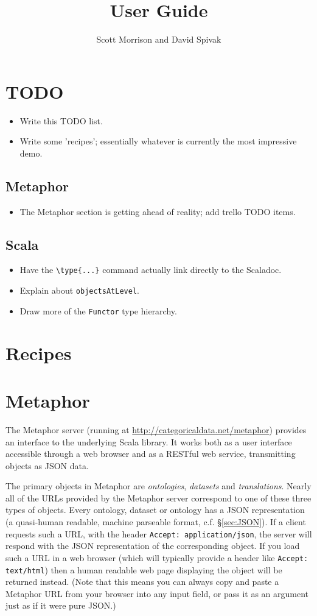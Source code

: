 \documentclass{amsart}
\title{User Guide}
\author{Scott Morrison and David Spivak}
\newcommand{\type}[1]{{\tt #1}}
\newcommand{\code}[1]{{\tt #1}}
\begin{document}
\maketitle

\section{TODO}
\begin{itemize}
\item Write this TODO list.
\item Write some 'recipes'; essentially whatever is currently the most impressive demo.
\end{itemize}

\subsection{Metaphor}
\begin{itemize}
\item The Metaphor section is getting ahead of reality; add trello TODO items.
\end{itemize}
\subsection{Scala}
\begin{itemize}
\item Have the \verb+\type{...}+ command actually link directly to the Scaladoc.
\item Explain about \code{objectsAtLevel}.
\item Draw more of the \type{Functor} type hierarchy.
\end{itemize}

\section{Recipes}

\section{Metaphor}
The Metaphor server (running at \url{http://categoricaldata.net/metaphor}) provides an interface to the underlying Scala library. It works both as a user interface accessible through a web browser and as a RESTful web service, transmitting objects as JSON data. 

The primary objects in Metaphor are \emph{ontologies}, \emph{datasets} and \emph{translations}. Nearly all of the URLs provided by the Metaphor server correspond to one of these three types of objects.  Every ontology, dataset or ontology has a JSON representation (a quasi-human readable, machine parseable format, c.f. \S \ref{sec:JSON}).  If a client requests such a URL, with the header \code{Accept: application/json}, the server will respond with the JSON representation of the corresponding object. If you load such a URL in a web browser (which will typically provide a header like \code{Accept: text/html}) then a human readable web page displaying the object will be returned instead. (Note that this means you can always copy and paste a Metaphor URL from your browser into any input field, or pass it as an argument just as if it were pure JSON.)
\end{document}
